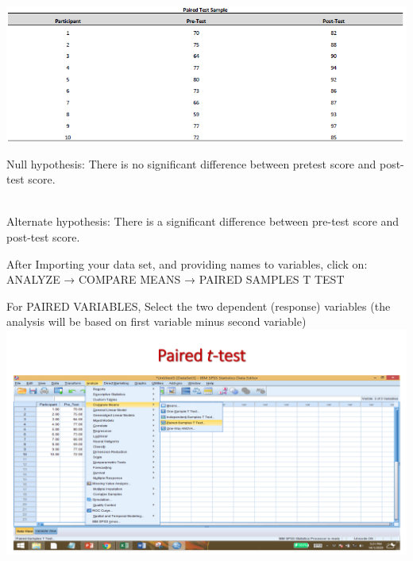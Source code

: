 \documentclass[
  letterpaper,
  DIV=11,
  numbers=noendperiod]{scrreprt}
\begin{document}
\includegraphics{images/paired-t-test.png}

\begin{tcolorbox}[enhanced jigsaw, rightrule=.15mm, arc=.35mm, colframe=quarto-callout-note-color-frame, coltitle=black, left=2mm, colbacktitle=quarto-callout-note-color!10!white, bottomtitle=1mm, titlerule=0mm, colback=white, breakable, opacitybacktitle=0.6, opacityback=0, toprule=.15mm, toptitle=1mm, title=\textcolor{quarto-callout-note-color}{\faInfo}\hspace{0.5em}{Hypothesis}, bottomrule=.15mm, leftrule=.75mm]

{Null hypothesis:} {There is no significant difference between pretest
score and post-test score.}\\
\strut \\
{Alternate hypothesis:} {There is a significant difference between
pre-test score and post-test score.}\\

\end{tcolorbox}

After Importing your data set, and providing names to variables, click
on:\\

{ANALYZE → COMPARE MEANS → PAIRED SAMPLES T TEST}

For PAIRED VARIABLES, Select the two dependent (response) variables (the
analysis will be based on first variable minus second variable)\\

\includegraphics{images/slides/img_Page_104.png}
\end{document}
